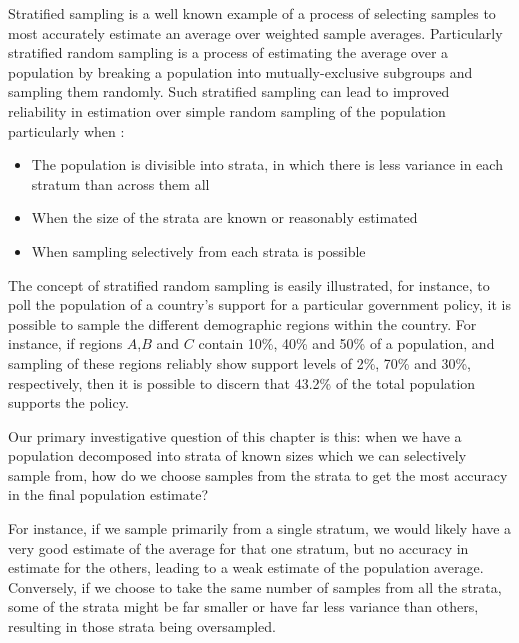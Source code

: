 
Stratified sampling is a well known example of a process of selecting samples to most accurately estimate an average over weighted sample averages.
Particularly stratified random sampling is a process of estimating the average over a population by breaking a population into mutually-exclusive subgroups and sampling them randomly.
Such stratified sampling can lead to improved reliability in estimation over simple random sampling of the population particularly when \cite{1938.10503378,10.2307/23339498}:
\begin{itemize}
\item The population is divisible into strata, in which there is less variance in each stratum than across them all 
\item When the size of the strata are known or reasonably estimated
\item When sampling selectively from each strata is possible 
\end{itemize}

The concept of stratified random sampling is easily illustrated, for instance, to poll the population of a country's support for a particular government policy, it is possible to sample the different demographic regions within the country.
For instance, if regions $A$,$B$ and $C$ contain 10\%, 40\% and 50\% of a population, and sampling of these regions reliably show support levels of 2\%, 70\% and 30\%, respectively, then it is possible to discern that 43.2\% of the total population supports the policy.

Our primary investigative question of this chapter is this: when we have a population decomposed into strata of known sizes which we can selectively sample from, how do we choose samples from the strata to get the most accuracy in the final population estimate?

For instance, if we sample primarily from a single stratum, we would likely have a very good estimate of the average for that one stratum, but no accuracy in estimate for the others, leading to a weak estimate of the population average.
Conversely, if we choose to take the same number of samples from all the strata, some of the strata might be far smaller or have far less variance than others, resulting in those strata being oversampled.


